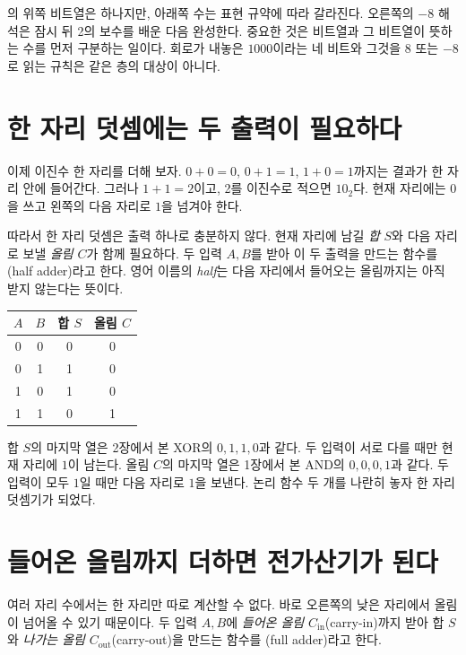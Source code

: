 의 위쪽 비트열은 하나지만, 아래쪽 수는 표현 규약에 따라 갈라진다. 오른쪽의 \(-8\) 해석은 잠시 뒤 2의 보수를 배운 다음 완성한다. 중요한 것은 비트열과 그 비트열이 뜻하는 수를 먼저 구분하는 일이다. 회로가 내놓은 \(1000\)이라는 네 비트와 그것을 8 또는 \(-8\)로 읽는 규칙은 같은 층의 대상이 아니다.

\section{한 자리 덧셈에는 두 출력이 필요하다}

이제 이진수 한 자리를 더해 보자. \(0+0=0\), \(0+1=1\), \(1+0=1\)까지는 결과가 한 자리 안에 들어간다. 그러나 \(1+1=2\)이고, 2를 이진수로 적으면 \(10_2\)다. 현재 자리에는 \(0\)을 쓰고 왼쪽의 다음 자리로 \(1\)을 넘겨야 한다.

따라서 한 자리 덧셈은 출력 하나로 충분하지 않다. 현재 자리에 남길 \emph{합} \(S\)와 다음 자리로 보낼 \emph{올림} \(C\)가 함께 필요하다. 두 입력 \(A,B\)를 받아 이 두 출력을 만드는 함수를 (half adder)라고 한다. 영어 이름의 \emph{half}는 다음 자리에서 들어오는 올림까지는 아직 받지 않는다는 뜻이다.

\begin{center}
\small
\begin{tabular}{cccc}
\toprule
\sffamily\bfseries \(A\) & \sffamily\bfseries \(B\) & \sffamily\bfseries 합 \(S\) & \sffamily\bfseries 올림 \(C\) \\
\midrule
0 & 0 & 0 & 0 \\
0 & 1 & 1 & 0 \\
1 & 0 & 1 & 0 \\
1 & 1 & 0 & 1 \\
\bottomrule
\end{tabular}
\end{center}

합 \(S\)의 마지막 열은 2장에서 본 XOR의 \(0,1,1,0\)과 같다. 두 입력이 서로 다를 때만 현재 자리에 \(1\)이 남는다. 올림 \(C\)의 마지막 열은 1장에서 본 AND의 \(0,0,0,1\)과 같다. 두 입력이 모두 \(1\)일 때만 다음 자리로 \(1\)을 보낸다. 논리 함수 두 개를 나란히 놓자 한 자리 덧셈기가 되었다.

\section{들어온 올림까지 더하면 전가산기가 된다}

여러 자리 수에서는 한 자리만 따로 계산할 수 없다. 바로 오른쪽의 낮은 자리에서 올림이 넘어올 수 있기 때문이다. 두 입력 \(A,B\)에 \emph{들어온 올림} \(C_{\mathrm{in}}\)(carry-in)까지 받아 합 \(S\)와 \emph{나가는 올림} \(C_{\mathrm{out}}\)(carry-out)을 만드는 함수를 (full adder)라고 한다.

